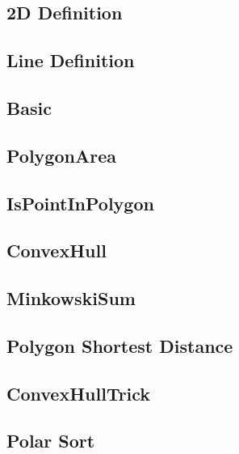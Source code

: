 \subsection{2D Definition}


\subsection{Line Definition}


\subsection{Basic}


\subsection{PolygonArea}


\subsection{IsPointInPolygon}


\subsection{ConvexHull}


\subsection{MinkowskiSum}


\subsection{Polygon Shortest Distance}


\subsection{ConvexHullTrick}


\subsection{Polar Sort}



